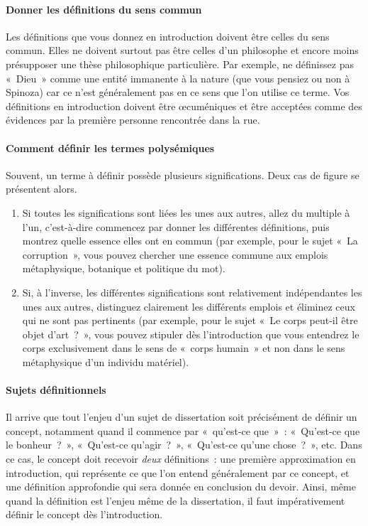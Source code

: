 \documentclass[a4paper]{article}
\begin{document}
\paragraph{Donner les définitions du sens commun}
\label{sec-2-2-1-3}

Les définitions que vous donnez en introduction doivent être celles du
sens commun. Elles ne doivent surtout pas être celles d'un philosophe et
encore moins présupposer une thèse philosophique particulière. Par
exemple, ne définissez pas « Dieu » comme une entité immanente à la nature
(que vous pensiez ou non à Spinoza) car ce n'est généralement pas en ce
sens que l'on utilise ce terme. Vos définitions en introduction doivent
être œcuméniques et être acceptées comme des évidences par la première
personne rencontrée dans la rue.

\paragraph{Comment définir les termes polysémiques}
\label{sec-2-2-1-4}

Souvent, un terme à définir possède plusieurs significations. Deux cas
de figure se présentent alors. 

\begin{enumerate}
\item Si toutes les significations sont liées les unes aux autres, allez du
multiple à l'un, c'est-à-dire commencez par donner les différentes
définitions, puis montrez quelle essence elles ont en commun (par
exemple, pour le sujet « La corruption », vous pouvez chercher une
essence commune aux emplois métaphysique, botanique et politique du
mot).
\item Si, à l'inverse, les différentes significations sont relativement
indépendantes les unes aux autres, distinguez clairement les
différents emplois et éliminez ceux qui ne sont pas pertinents (par
exemple, pour le sujet « Le corps peut-il être objet d'art ? », vous
pouvez stipuler dès l'introduction que vous entendrez le corps
exclusivement dans le sens de « corps humain » et non dans le sens
métaphysique d'un individu matériel).
\end{enumerate}

\paragraph{Sujets définitionnels}
\label{sec-2-2-1-5}

Il arrive que tout l'enjeu d'un sujet de dissertation soit précisément
de définir un concept, notamment quand il commence par « qu'est-ce que » :
« Qu'est-ce que le bonheur ? », « Qu'est-ce qu'agir ? », « Qu'est-ce qu'une
chose ? », etc. Dans ce cas, le concept doit recevoir \emph{deux}
définitions : une première approximation en introduction, qui représente
ce que l'on entend généralement par ce concept, et une définition
approfondie qui sera donnée en conclusion du devoir. Ainsi, même quand
la définition est l'enjeu même de la dissertation, il faut
impérativement définir le concept dès l'introduction.
\end{document}
